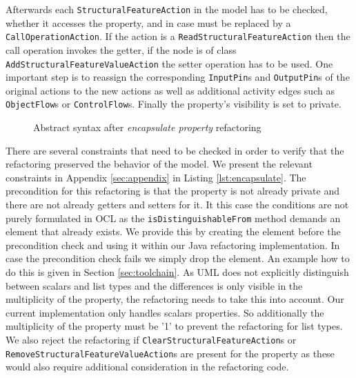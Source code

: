 \documentclass{llncs}
\begin{document}
Afterwards each \texttt{Structural\-Feature\-Action} in the model has to be checked, whether it accesses 
the property, and in case must be replaced by a \texttt{Call\-Operation\-Action}. If the action is a 
\texttt{Read\-Structural\-Feature\-Action} then the call operation invokes the getter, if the node is of class 
\texttt{Add\-Structural\-Feature\-Value\-Action} the setter operation has to be used. 
One important step is to reassign the corresponding \texttt{InputPin}s and \texttt{OutputPin}s of the original 
actions to the new actions as well as additional activity edges such as \texttt{ObjectFlow}s or \texttt{ControlFlow}s.
Finally the property's visibility is set to private.

\begin{figure}
 \caption{Abstract syntax after \textit{encapsulate property} refactoring}
 \label{fig:encapsulateafter}
\end{figure}


There are several constraints that need to be checked in order to verify that the refactoring preserved the behavior of the model. 
We present the relevant constraints in Appendix \ref{sec:appendix} in Listing \ref{lst:encapsulate}.
The precondition for this refactoring is that the property is not already private and there are not already getters 
and setters for it. It this case the conditions are not purely formulated in OCL as the \texttt{is\-Distinguishable\-From} method 
demands an element that already exists. We provide this by creating the element before the precondition check and using it 
within our Java refactoring implementation. In case the precondition check fails we simply drop the element. An example how 
to do this is given in Section \ref{sec:toolchain}. 
As UML does not explicitly distinguish between scalars and list types and the differences is only visible
in the multiplicity of the property, the refactoring needs to take this into account. Our current implementation only handles
scalars properties. So additionally the multiplicity of the property must be '1' to prevent the refactoring for list types. We also reject 
the refactoring if \texttt{Clear\-Structural\-Feature\-Action}s or \texttt{Remove\-Structural\-Feature\-Value\-Action}s are present for 
the property as these would also require additional consideration in the refactoring code.
\end{document}
